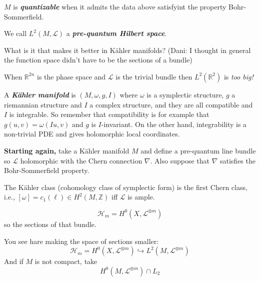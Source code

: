\begin{defn}\leavevmode
	$M$ is \textit{\textbf{quantizable}} when it admits the data above satisfyint the property Bohr-Sommerfield. 

	We call $L^2(M,\mathcal{L})$ a \textit{\textbf{pre-quantum Hilbert space}}.
\end{defn}

\begin{question}\leavevmode
	What is it that makes it better in Kähler manifolds? (Dani: I thought in general the function space didn't have to be the sections of a bundle)
\end{question}

\begin{remark}[Sergey]\leavevmode
	When $\mathbb{R}^{2n}$ is the phase space and $\mathcal{L}$ is the trivial bundle then $L^2( \mathbb{R}^{2} )$ is \textit{too big!} 
\end{remark}

\begin{defn}\leavevmode
	A \textit{\textbf{Kähler manifold} } is $(M, \omega,g,I)$ where $\omega$ is a symplectic structure, $g$ a riemannian structure and  $I$ a complex structure, and they are all compatible and $I$ is integrable. So remember that compatibility is for example that $g(u,v)=\omega(Iu,v)$ and $g$ is  $I$-invariant. On the other hand, integrability is a non-trivial PDE and gives holomorphic local coordinates.
\end{defn}

{\color{3}\bfseries Starting again,}\hspace{.5em} take a Kähler manifold $M$ and define a pre-quantum line bundle so  $\mathcal{L}$ holomorphic with the Chern connection $\nabla$. Also suppose that $\nabla$ satisfies the Bohr-Sommerfield property.

\begin{remark}\leavevmode
	The Kähler class (cohomology class of symplectic form) is the first Chern class, i.e., $[\omega]=c_1(\ell)\in H^{2}(M,\mathbb{Z})$ iff $\mathcal{L}$ is ample.
\end{remark}

\begin{defn}\leavevmode
	\[\mathcal{H}_m=H^{0}(X,\mathcal{L}^{\otimes m})\]
	so the sections of that bundle.
\end{defn}

You see hare making the space of sections smaller:
	\[\mathcal{H}_m=H^{0}(X,\mathcal{L}^{\otimes m})\hookrightarrow L^2(M,\mathcal{L}^{\otimes m})\]
And if $M$ is not compact, take
\[H^{0}(M,\mathcal{L}^{\otimes m})\cap L_2\]

